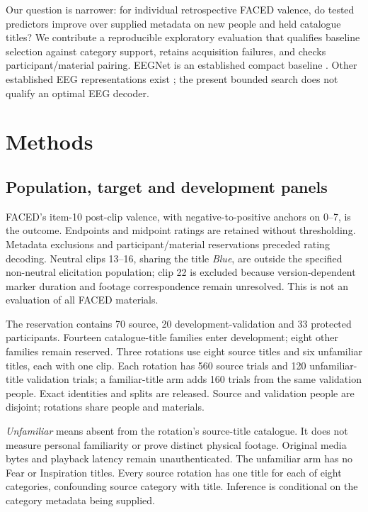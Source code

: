 \documentclass[11pt,a4paper]{article}
\begin{document}
Our question is narrower: for individual retrospective FACED valence, do tested predictors improve over supplied metadata on new people and held catalogue titles? We contribute a reproducible exploratory evaluation that qualifies baseline selection against category support, retains acquisition failures, and checks participant/material pairing. EEGNet is an established compact baseline \cite{lawhern2018eegnet}. Other established EEG representations exist \cite{zhang2023spatiotemporal}; the present bounded search does not qualify an optimal EEG decoder.

\section{Methods}
\subsection{Population, target and development panels}
FACED's item-10 post-clip valence, with negative-to-positive anchors on 0--7, is the outcome. Endpoints and midpoint ratings are retained without thresholding. Metadata exclusions and participant/material reservations preceded rating decoding. Neutral clips 13--16, sharing the title \emph{Blue}, are outside the specified non-neutral elicitation population; clip 22 is excluded because version-dependent marker duration and footage correspondence remain unresolved. This is not an evaluation of all FACED materials.

The reservation contains 70 source, 20 development-validation and 33 protected participants. Fourteen catalogue-title families enter development; eight other families remain reserved. Three rotations use eight source titles and six unfamiliar titles, each with one clip. Each rotation has 560 source trials and 120 unfamiliar-title validation trials; a familiar-title arm adds 160 trials from the same validation people. Exact identities and splits are released. Source and validation people are disjoint; rotations share people and materials.

\emph{Unfamiliar} means absent from the rotation's source-title catalogue. It does not measure personal familiarity or prove distinct physical footage. Original media bytes and playback latency remain unauthenticated. The unfamiliar arm has no Fear or Inspiration titles. Every source rotation has one title for each of eight categories, confounding source category with title. Inference is conditional on the category metadata being supplied.
\end{document}
